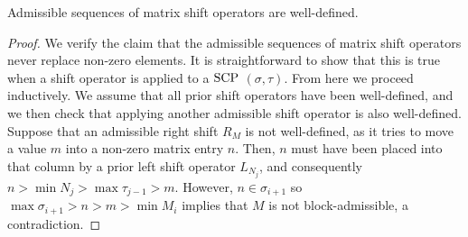 \begin{proposition}
Admissible sequences of matrix shift operators are well-defined.
\end{proposition}

\begin{proof}
We verify the claim that the admissible sequences of matrix shift operators never replace non-zero elements.
It is straightforward to show that this is true when a shift operator is applied to a $\mathrm{SCP}$ $(\sigma,\tau)$.
From here we proceed inductively.
We assume that all prior shift operators have been well-defined, and we then check that applying another admissible shift operator is also well-defined.
Suppose that an admissible right shift $R_{M}$ is not well-defined, as it tries to move a value $m$ into a non-zero matrix entry $n$.
Then, $n$ must have been placed into that column by a prior left shift operator $L_{N_j}$, and consequently $n>\min N_j > \max \tau_{j-1}> m$.
However, $n\in \sigma_{i+1}$ so $\max \sigma_{i+1}>n>m>\min M_i $ implies that $M$ is not block-admissible, a contradiction.
\end{proof}

